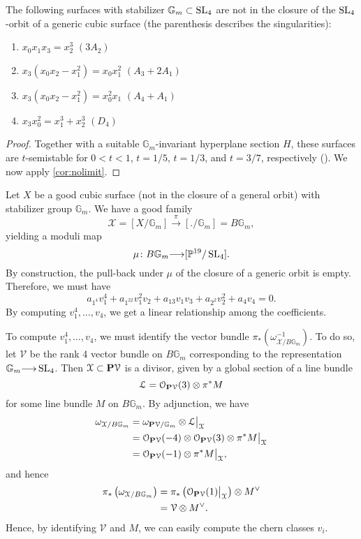 \documentclass[12pt,reqno]{amsart}
\renewcommand{\to}{{\longrightarrow}}
\numberwithin{equation}{section}
\begin{document}
\begin{corollary}
  The following surfaces with stabilizer $\mathbb G_m \subset \SL_4$ are not in the closure of the $\SL_4$-orbit of a generic cubic surface (the parenthesis describes the singularities):
  \begin{enumerate}
  \item $x_0x_1x_3 = x_2^3$ \quad $(3A_2)$
  \item $x_3(x_0x_2-x_1^2) = x_0x_1^2$ \quad $(A_3 + 2A_1)$
  \item $x_3(x_0x_2-x_1^2) = x_0^2x_1$ \quad $(A_4 + A_1)$
  \item $x_3x_0^2 = x_1^3 + x_2^3$ \quad $(D_4)$
  \end{enumerate}
\end{corollary}
\begin{proof}
  Together with a suitable $\mathbb G_m$-invariant hyperplane section $H$, these surfaces are $t$-semistable for $0 < t < 1$, $t = 1/5$, $t = 1/3$, and $t = 3/7$, respectively (\cite[Table~2]{gal.mar:19}).
  We now apply \autoref{cor:nolimit}.
\end{proof}

Let $X$ be a good cubic surface (not in the closure of a general orbit) with stabilizer group $\mathbb G_m$.
We have a good family
\[ \mathcal X = [X / \mathbb G_m] \xrightarrow{\pi} [. / \mathbb G_m] = B\mathbb G_m,\]
yielding a moduli map
\[\mu \colon B \mathbb G_m \to [\mathbb P^{19}/\SL_4].\]
By construction, the pull-back under $\mu$ of the closure of a generic orbit is empty.
Therefore, we must have
\[ a_{1^4} v_1^4 + a_{1^22}v_1^2v_2 + a_{13}v_1v_3 + a_{2^2}v_2^2 + a_4v_4 = 0.\]
By computing $v_1^4, \dots, v_4$, we get a linear relationship among the coefficients.

To compute $v_1^4, \dotso, v_4$, we must identify the vector bundle $\pi_* \left( \omega_{\mathcal X/B\mathbb G_m}^{-1}\right)$.
To do so, let $\mathcal V$ be the rank 4 vector bundle on $B \mathbb G_m$ corresponding to the representation $\mathbb G_m \to \SL_4$.
Then $\mathcal X \subset \P \mathcal V$ is a divisor, given by a global section of a line bundle
\[ \mathcal L = \mathcal O_{\P \mathcal V}(3) \otimes \pi^* M\]
for some line bundle $M$ on $B\mathbb G_m$.
By adjunction, we have
\begin{align*}
  \omega_{\mathcal X/B\mathbb G_m} &= \omega_{\P \mathcal V / \mathbb G_m} \otimes \mathcal L \big|_{\mathcal X}\\
                                   &= \mathcal O_{\P \mathcal V}(-4) \otimes \mathcal O_{\P \mathcal V}(3) \otimes \pi^* M \big|_{\mathcal X} \\
                                   &= \mathcal O_{\P \mathcal V}(-1) \otimes \pi^* M \big |_{\mathcal X},
\end{align*}
and hence
\begin{align*}
  \pi_* \left( \omega_{\mathcal X/B\mathbb G_m}  \right) &= \pi_* \left( \mathcal O_{\P \mathcal V}(1) \big|_{\mathcal X} \right) \otimes M^\vee \\
  &= \mathcal V \otimes M^\vee.
\end{align*}
Hence, by identifying $\mathcal V$ and $M$, we can easily compute the chern classes $v_i$.
\end{document}
